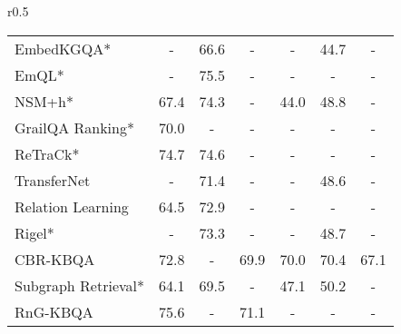 \documentclass{article} \usepackage{iclr2024_conference,times}
\begin{document}
\begin{wraptable}{r}{0.5\textwidth}
{\begin{tabular}{lcccccc}
EmbedKGQA*                       & -             & 66.6                                         & \multicolumn{1}{c|}{-}             & -             & 44.7                                         & -             \\
EmQL*                            & -             & 75.5                                         & \multicolumn{1}{c|}{-}             & -             & -                                            & -             \\
NSM+h*                          & 67.4          & 74.3                                         & \multicolumn{1}{c|}{-}             & 44.0          & 48.8                                         & -             \\
GrailQA Ranking*                & 70.0          & -                                            & \multicolumn{1}{c|}{-}             & -             & -                                            & -             \\
ReTraCk*                         & 74.7          & 74.6                                         & \multicolumn{1}{c|}{-}             & -             & -                                            & -             \\
TransferNet                     & -             & 71.4                                         & \multicolumn{1}{c|}{-}             & -             & 48.6                                         & -             \\
Relation Learning               & 64.5          & 72.9                                         & \multicolumn{1}{c|}{-}             & -             & -                                            & -             \\
Rigel*                           & -             & 73.3                                         & \multicolumn{1}{c|}{-}             & -             & 48.7                                         & -             \\
CBR-KBQA                         & 72.8          & -                                            & \multicolumn{1}{c|}{69.9}          & 70.0          & 70.4                                         & 67.1          \\
Subgraph Retrieval*              & 64.1          & 69.5                                         & \multicolumn{1}{c|}{-}             & 47.1          & 50.2                                         & -             \\
RnG-KBQA                         & 75.6          & -                                            & \multicolumn{1}{c|}{71.1}          & -             & -                                            & -             \\

\end{tabular}}
\end{wraptable}
\end{document}
